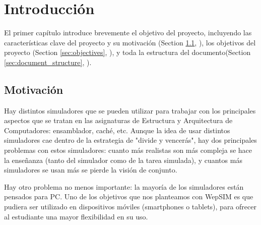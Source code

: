 \chead[]{}
\renewcommand{\headrulewidth}{0.5pt}

\lfoot[]{}
\cfoot[]{}
\rfoot[]{}
\renewcommand{\footrulewidth}{0pt}

\chapter{Introducción}
\label{ch:introduction}

El primer capítulo introduce brevemente el objetivo del proyecto, incluyendo las características clave del proyecto y su motivación (Section \ref{sec:background_and_motivation}, \textit{}), los objetivos del proyecto (Section \ref{sec:objectives}, \textit{}), y toda la estructura del documento(Section \ref{sec:document_structure}, \textit{}).

\section{Motivación}
\label{sec:background_and_motivation}

Hay distintos simuladores que se pueden utilizar para trabajar con los principales aspectos que se tratan en las asignaturas de Estructura y Arquitectura de Computadores: ensamblador, caché, etc. Aunque la idea de usar distintos simuladores cae dentro de la estrategia de "divide y vencerás", hay dos principales problemas con estos simuladores: cuanto más realistas son más compleja se hace la enseñanza (tanto del simulador como de la tarea simulada), y cuantos más simuladores se usan más se pierde la visión de conjunto.

Hay otro problema no menos importante: la mayoría de los simuladores están pensados para PC. Uno de los objetivos que nos planteamos con WepSIM es que pudiera ser utilizado en dispositivos móviles (smartphones o tablets), para ofrecer al estudiante una mayor flexibilidad en su uso.

